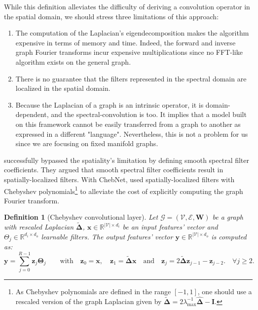 \documentclass{article}
\newtheorem{definition}{Definition}[section]
\begin{document}
While this definition alleviates the difficulty of deriving a convolution operator in the spatial domain, we should stress three limitations of this approach:

\begin{enumerate}
    \item The computation of the Laplacian's eigendecomposition makes the algorithm expensive in terms of memory and time. Indeed, the forward and inverse graph Fourier transforms incur expensive multiplications since no FFT-like algorithm exists on the general graph.
    \item There is no guarantee that the filters represented in the spectral domain are localized in the spatial domain.
    \item Because the Laplacian of a graph is an intrinsic operator, it is domain-dependent, and the spectral-convolution is too. It implies that a model built on this framework cannot be easily transferred from a graph to another as expressed in a different "language". Nevertheless, this is not a problem for us since we are focusing on fixed manifold graphs.
\end{enumerate}

\citet{henaff2015deep} successfully bypassed the spatiality's limitation by defining smooth spectral filter coefficients. They argued that smooth spectral filter coefficients result in spatially-localized filters. With ChebNet, \citet{defferrard2016chebnet} used spatially-localized filters with Chebyshev polynomials\footnote{As Chebyshev polynomials are defined in the range $[-1, 1]$, one should use a rescaled version of the graph Laplacian given by $\boldsymbol{\tilde{\Delta}} = 2\lambda_{\max}^{-1}\boldsymbol{\hat{\Delta}} - \boldsymbol{I}$.} to alleviate the cost of explicitly computing the graph Fourier transform.

\begin{definition}[Chebyshev convolutional layer] \label{def:cheb_conv}
Let $\mathcal{G} = (\mathcal{V}, \mathcal{E}, \boldsymbol{W})$ be a graph with rescaled Laplacian $\boldsymbol{\tilde{\Delta}}$, $\boldsymbol{x} \in \mathbb{R}^{|\mathcal{V}| \times d_i}$  be an input features' vector and $\Theta_j \in \mathbb{R}^{d_i \times d_o}$ learnable filters. The output features' vector $\boldsymbol{y} \in \mathbb{R}^{|\mathcal{V}| \times d_o}$ is computed as:
\begin{equation}
\boldsymbol{y} = \sum_{j=0}^{R-1} \boldsymbol{z}_j \boldsymbol{\Theta}_j \qquad \text{with} \quad \boldsymbol{z}_0 = \boldsymbol{x}, \quad \boldsymbol{z}_1 = \boldsymbol{\tilde{\Delta} x} \quad  \text{and} \quad \boldsymbol{z}_j = 2 \boldsymbol{\tilde{\Delta} z}_{j-1} - \boldsymbol{z}_{j-2}. \quad \forall j \geq 2.
\end{equation}
\end{definition}
\end{document}
